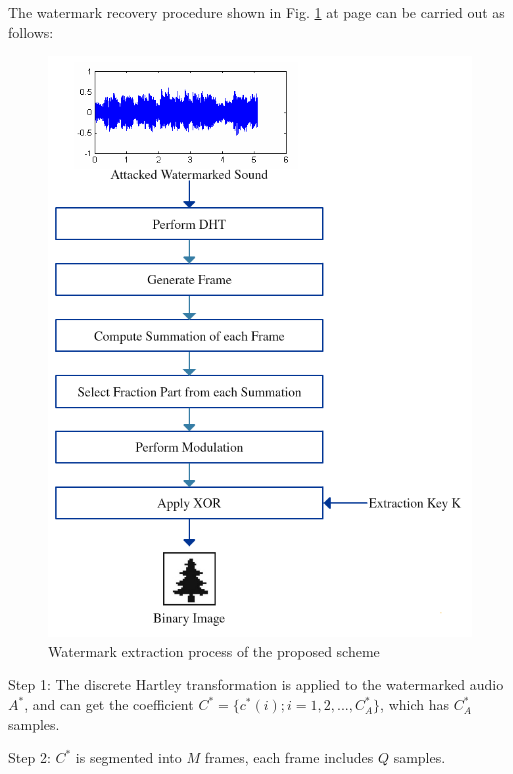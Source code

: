 \documentclass[12pt,a4paper]{report}
\begin{document}
The watermark recovery procedure shown in Fig. \ref{fig:extraction} at page \pageref{fig:extraction} can be carried out as follows:

\begin{figure}[h!]
\centering
\includegraphics[scale=.7]{image/Extraction.png}
\caption{Watermark extraction process of the proposed scheme}
\label{fig:extraction}
\end{figure}

\bigskip

Step 1:
The discrete Hartley transformation is applied to the watermarked audio $ A^* $, and can get the coefficient 
$ C^* = \{c^*(i); i = 1,2,...,C_A^*\} $, which has $ C_A^* $ samples.

\bigskip

Step 2:
$ C^* $ is segmented into $M$ frames, each frame includes $Q$ samples.

\bigskip
\end{document}

